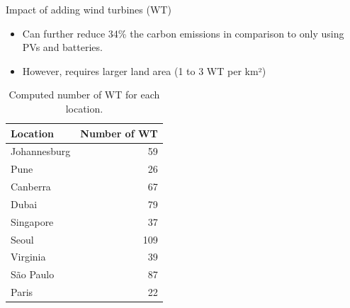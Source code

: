 \documentclass[Ligatures=TeX,table,svgnames,usetotalslideindicator,compress,10pt]{beamer}
\begin{document}
\begin{frame}{Impact of adding wind turbines (WT) }

  \begin{itemize}    
     \item  Can further reduce 34\% the carbon emissions in comparison
       to only using PVs and batteries.
     \item However, requires larger land area (1 to 3 WT per km²)
  \end{itemize}




  \begin{table}[h]
  \caption{Computed number of WT for each location.}\label{tab:results_wt} \centering
  \begin{tabular}{|l|r|}
  \hline
    
  \textbf{Location} &   \textbf{Number of WT} \\
  \hline
  Johannesburg & 59   \\
  \hline
  Pune         & 26 \\
  \hline
  Canberra    & 67 \\
  \hline
  Dubai       &  79  \\
  \hline
  Singapore   & 37 \\
  \hline     
  Seoul       & 109  \\
  \hline
  Virginia   & 39 \\
  \hline
  São Paulo   & 87 \\
  \hline 
  Paris    &   22 \\
  \hline
  
\end{tabular}  
\end{table}
  
\end{frame}
\end{document}
